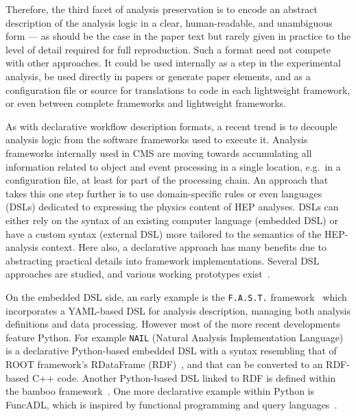 \documentclass[11pt]{article}
\begin{document}
Therefore, the third facet of analysis preservation is to encode an abstract description of the analysis logic in a clear, human-readable, and unambiguous form --- as should be the case in the paper text but rarely given in practice to the level of detail required for full reproduction. Such a format need not compete with other approaches. It could be used internally as a step in the experimental analysis, be used directly in papers or generate paper elements, and as a configuration file or source for translations to code in each lightweight framework, or even between complete frameworks and lightweight frameworks.

As with declarative workflow description formats, a recent trend is to decouple analysis logic from the software frameworks used to execute it. Analysis frameworks internally used in CMS 
are moving towards accumulating all information related to object and event processing in a single location, e.g.~in a configuration file, at least for part of the processing chain. An approach that takes this one step further is to use domain-specific rules or even languages (DSLs) dedicated to expressing the physics content of HEP analyses. DSLs can either rely on the syntax of an existing computer language (embedded DSL) or have a custom syntax (external DSL) more tailored to the semantics of the HEP-analysis context. Here also, a declarative approach has many benefits due to abstracting practical details into framework implementations. Several DSL approaches are studied, and various working prototypes exist~\cite{Sekmen:2020vph}. 

On the embedded DSL side, an early example is the \texttt{F.A.S.T.} framework~\cite{FAST} which incorporates a YAML-based DSL for analysis description, managing both analysis definitions and data processing. However most of the more recent developments feature Python. For example \texttt{NAIL} (Natural Analysis Implementation Language)~\cite{NAIL} is a declarative Python-based embedded DSL with a syntax resembling that of ROOT framework's RDataFrame (RDF)~\cite{enrico_guiraud_2017_26023}, and that can be converted to an RDF-based C++ code.  Another Python-based DSL linked to RDF is defined within the bamboo framework~\cite{David:2021ohq}.  One more declarative example within Python is FuncADL, which is inspired by functional programming and query languages~\cite{Proffitt:2021wfh}.
\end{document}

